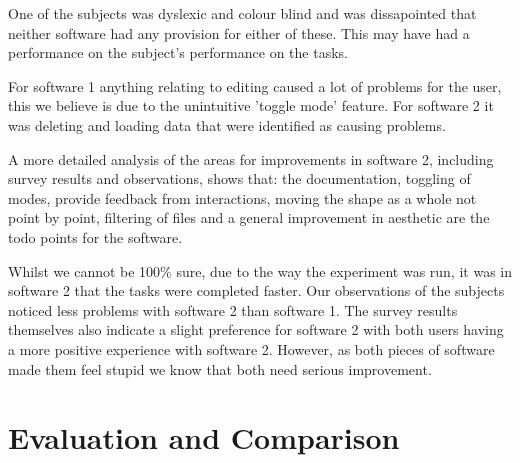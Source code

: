 \documentclass[a4paper,11pt,oneside]{article}
\begin{document}
One of the subjects was dyslexic and colour blind and was dissapointed that neither software had any provision for either of these.  This may have had a performance on the subject's performance on the tasks.

For software 1 anything relating to editing caused a lot of problems for the user, this we believe is due to the unintuitive 'toggle mode' feature.  For software 2 it was deleting and loading data that were identified as causing problems.

A more detailed analysis of the areas for improvements in software 2, including survey results and observations, shows that: the documentation, toggling of modes, provide feedback from interactions, moving the shape as a whole not point by point, filtering of files and a general improvement in aesthetic are the todo points for the software.

Whilst we cannot be 100\% sure, due to the way the experiment was run, it was in software 2 that the tasks were completed faster.  Our observations of the subjects noticed less problems with software 2 than software 1.  The survey results themselves also indicate a slight preference for software 2 with both users having a more positive experience with software 2. However, as both pieces of software made them feel stupid we know that both need serious improvement.

\section{Evaluation and Comparison}
\end{document}

